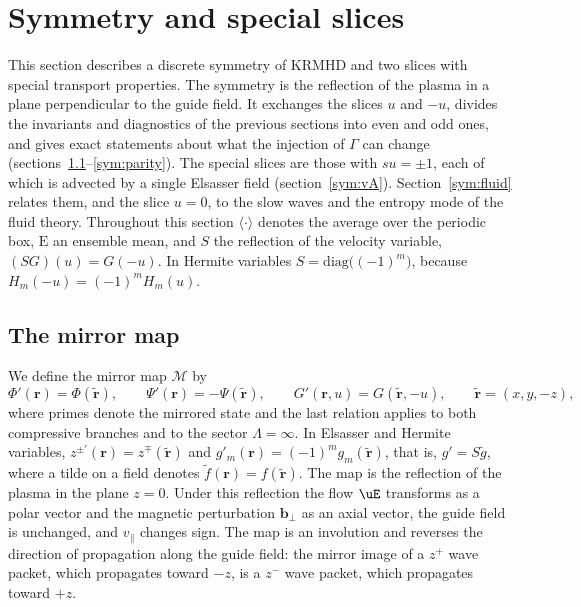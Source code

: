 \section{Symmetry and special slices}\label{sec:symmetry}

This section describes a discrete symmetry of KRMHD and two slices with special transport properties. The symmetry is the reflection of the plasma in a plane perpendicular to the guide field. It exchanges the slices $u$ and $-u$, divides the invariants and diagnostics of the previous sections into even and odd ones, and gives exact statements about what the injection of $\Gamma$ can change (sections~\ref{sym:map}--\ref{sym:parity}). The special slices are those with $su=\pm1$, each of which is advected by a single Elsasser field (section~\ref{sym:vA}). Section~\ref{sym:fluid} relates them, and the slice $u=0$, to the slow waves and the entropy mode of the fluid theory. Throughout this section $\langle\cdot\rangle$ denotes the average over the periodic box, $\mathrm E$ an ensemble mean, and $S$ the reflection of the velocity variable, $(SG)(u)=G(-u)$. In Hermite variables $S=\mathrm{diag}\big((-1)^m\big)$, because $H_m(-u)=(-1)^mH_m(u)$.

\subsection{The mirror map}\label{sym:map}

We define the mirror map $\mathcal M$ by
\begin{equation}\label{eq:mirror}
  \Phi'(\boldsymbol r)=\Phi(\tilde{\boldsymbol r}),\qquad
  \Psi'(\boldsymbol r)=-\Psi(\tilde{\boldsymbol r}),\qquad
  G'(\boldsymbol r,u)=G(\tilde{\boldsymbol r},-u),\qquad
  \tilde{\boldsymbol r}=(x,y,-z),
\end{equation}
where primes denote the mirrored state and the last relation applies to both compressive branches and to the sector $\Lambda=\infty$. In Elsasser and Hermite variables, $z^{\pm\prime}(\boldsymbol r)=z^\mp(\tilde{\boldsymbol r})$ and $g'_m(\boldsymbol r)=(-1)^mg_m(\tilde{\boldsymbol r})$, that is, $g'=S\tilde g$, where a tilde on a field denotes $\tilde f(\boldsymbol r)=f(\tilde{\boldsymbol r})$. The map is the reflection of the plasma in the plane $z=0$. Under this reflection the flow $\uE$ transforms as a polar vector and the magnetic perturbation $\boldsymbol b_\perp$ as an axial vector, the guide field is unchanged, and $v_\parallel$ changes sign. The map is an involution and reverses the direction of propagation along the guide field: the mirror image of a $z^+$ wave packet, which propagates toward $-z$, is a $z^-$ wave packet, which propagates toward $+z$.

